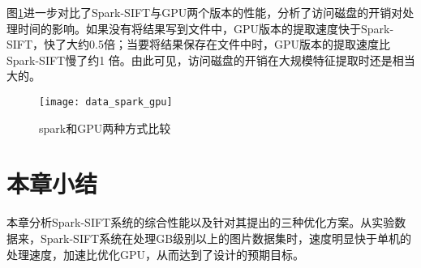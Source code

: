 图\ref{fig:data_spark_gpu}进一步对比了Spark-SIFT与GPU两个版本的性能，分析了访问磁盘的开销对处理时间的影响。如果没有将结果写到文件中，GPU版本的提取速度快于Spark-SIFT，快了大约0.5倍；当要将结果保存在文件中时，GPU版本的提取速度比Spark-SIFT慢了约1 倍。由此可见，访问磁盘的开销在大规模特征提取时还是相当大的。
\begin{figure}[htp]
\centering
\texttt{[image: data\_spark\_gpu]}
\caption{spark和GPU两种方式比较}
\label{fig:data_spark_gpu}
\end{figure}
\section{本章小结}
本章分析Spark-SIFT系统的综合性能以及针对其提出的三种优化方案。从实验数据来，Spark-SIFT系统在处理GB级别以上的图片数据集时，速度明显快于单机的处理速度，加速比优化GPU，从而达到了设计的预期目标。

